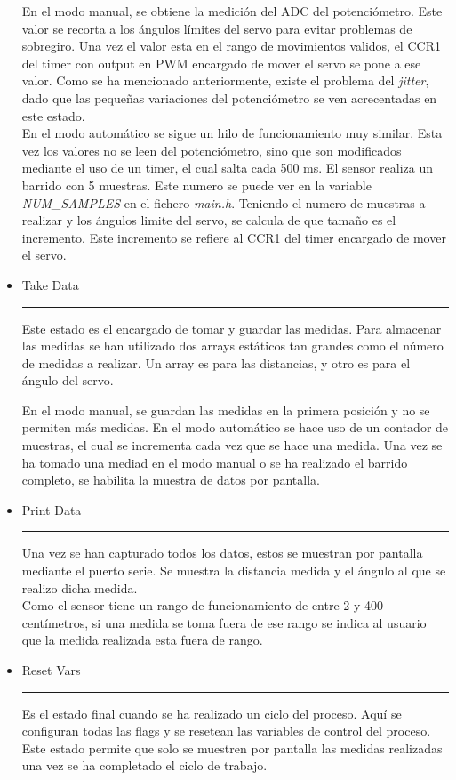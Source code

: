 \documentclass[a4paper, 12pt]{article}
\newcommand{\sangria}{\hspace*{1em}}
\newcommand{\Estado}[1]{
  \item[] {\Large {#1}\\ \rule{8em}{0.5pt} }
}
\begin{document}
\begin{itemize}
  En el modo manual, se obtiene la medición del ADC del potenciómetro. Este valor se recorta a los ángulos límites del servo para evitar problemas de sobregiro. Una vez el valor esta en el rango de movimientos validos, el CCR1 del timer con output en PWM encargado de mover el servo se pone a ese valor.
  Como se ha mencionado anteriormente, existe el problema del \textit{jitter}, dado que las pequeñas variaciones del potenciómetro se ven acrecentadas en este estado.\\

  En el modo automático se sigue un hilo de funcionamiento muy similar. Esta vez los valores no se leen del potenciómetro, sino que son modificados mediante el uso de un timer, el cual salta cada 500 ms. El sensor realiza un barrido con 5 muestras. Este numero se puede ver en la variable \textit{NUM\_SAMPLES} en el fichero \textit{main.h}.
  Teniendo el numero de muestras a realizar y los ángulos limite del servo, se calcula de que tamaño es el incremento. Este incremento se refiere al CCR1 del timer encargado de mover el servo.

  
\vspace*{2em}
\Estado{Take Data}

\sangria{} Este estado es el encargado de tomar y guardar las medidas. Para almacenar las medidas se han utilizado dos arrays estáticos tan grandes como el número de medidas a realizar. Un array es para las distancias, y otro es para el ángulo del servo.

En el modo manual, se guardan las medidas en la primera posición y no se permiten más medidas. En el modo automático se hace uso de un contador de muestras, el cual se incrementa cada vez que se hace una medida.
Una vez se ha tomado una mediad en el modo manual o se ha realizado el barrido completo, se habilita la muestra de datos por pantalla.

\newpage
\Estado{Print Data}
  
  \sangria{} Una vez se han capturado todos los datos, estos se muestran por pantalla mediante el puerto serie.
  Se muestra la distancia medida y el ángulo al que se realizo dicha medida.\\
  
  Como el sensor tiene un rango de funcionamiento de entre 2 y 400 centímetros, si una medida se toma fuera de ese rango se indica al usuario que la medida realizada esta fuera de rango.

\vspace*{2em}
\Estado{Reset Vars}

  \sangria{} Es el estado final cuando se ha realizado un ciclo del proceso. Aquí se configuran todas las flags y se resetean las variables de control del proceso. Este estado permite que solo se muestren por pantalla las medidas realizadas una vez se ha completado el ciclo de trabajo.

\end{itemize}
\end{document}
